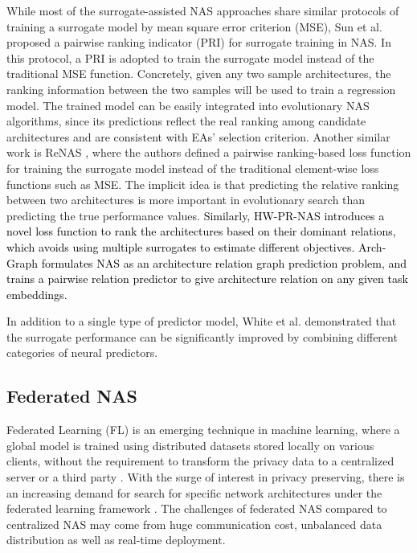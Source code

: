 \documentclass[journal]{IEEEtran}
\begin{document}
While most of the surrogate-assisted NAS approaches share similar protocols of training a surrogate model by mean square error criterion (MSE), Sun et al. \cite{sun2021novel} proposed a pairwise ranking indicator (PRI) for surrogate training in NAS. In this protocol, a PRI is adopted to train the surrogate model instead of the traditional MSE function. Concretely, given any two sample architectures, the ranking information between the two samples will be used to train a regression model. The trained model can be easily integrated into evolutionary NAS algorithms, since its predictions reflect the real ranking among candidate architectures and are consistent with EAs' selection criterion. Another similar work is ReNAS \cite{xu2021renas}, where the authors defined a pairwise ranking-based loss function for training the surrogate model instead of the traditional element-wise loss functions such as MSE. The implicit idea is that predicting the relative ranking between two architectures is more important in evolutionary search than predicting the true performance values. \textcolor{black}{Similarly, HW-PR-NAS \cite{benmeziane2022pareto} introduces a novel loss function to rank the architectures based on their dominant relations, which avoids using multiple surrogates to estimate different objectives. Arch-Graph \cite{huang2022arch} formulates NAS as an architecture relation graph prediction problem, and trains a pairwise relation predictor to give architecture relation on any given task embeddings.}

In addition to a single type of predictor model, White et al. \cite{white2021powerful} demonstrated that the surrogate performance can be significantly improved by combining different categories of neural predictors.

\subsection{Federated NAS}
Federated Learning (FL) \cite{mcmahan2017communication} is an emerging technique in machine learning, where a global model is trained using distributed datasets stored locally on various clients, without the requirement to transform the privacy data to a centralized server or a third party \cite{yang2019federated, zhu2021federated}. With the surge of interest in privacy preserving, there is an increasing demand for search for specific network architectures under the federated learning framework \cite{zhu2021from, zhu2021real, he2020towards, liang2021self, singh2020differentially, zhu2019multi, xu2020federated}. The challenges of federated NAS compared to centralized NAS may come from huge communication cost, unbalanced data distribution as well as real-time deployment.
\end{document}
